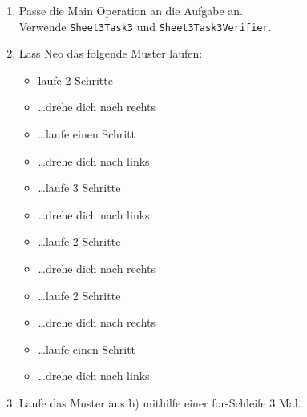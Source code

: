 
\begin{enumerate}
	\item 
		Passe die Main Operation an die Aufgabe an. \\
		Verwende \lstinline{Sheet3Task3} und \lstinline{Sheet3Task3Verifier}.
	\item
		Lass Neo das folgende Muster laufen:
		\begin{itemize}
			\item[] laufe 2 Schritte
			\item[] …drehe dich nach rechts
			\item[] …laufe einen Schritt
			\item[] …drehe dich nach links
			\item[] …laufe 3 Schritte
			\item[] …drehe dich nach links
			\item[] …laufe 2 Schritte
			\item[] …drehe dich nach rechts
			\item[] …laufe 2 Schritte
			\item[] …drehe dich nach rechts
			\item[] …laufe einen Schritt
			\item[] …drehe dich nach links.
		\end{itemize}
	\item
		Laufe das Muster aus b) mithilfe einer for-Schleife 3 Mal.
\end{enumerate}


